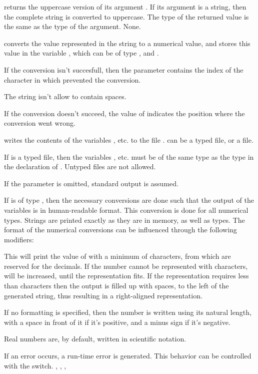 \documentclass{report}
\begin{document}
{ returns the uppercase version of its argument .
If its argument is a string, then the complete string is converted to 
uppercase. The type of the returned value is the same as the type of the
argument.}
{None.}
{}



{ converts the value represented in the string  to a numerical
value, and stores this value in the variable , which 
can be of type ,  and .

If the conversion isn't succesfull, then the parameter  contains
the index of the character in  which prevented the conversion.

The string  isn't allow to contain spaces.}
{If the conversion doesn't succeed, the value of  indicates the
position where the conversion went wrong.}
{}



{ writes the contents of the variables ,  etc. to
the file .  can be a typed file, or a  file.

If  is a typed file, then the variables ,  etc. must
be of the same type as the type in the declaration of . Untyped files
are not allowed.

If the parameter  is omitted, standard output is assumed. 

If  is of type , then the necessary conversions are done
such that the output of the variables is in human-readable format.
This conversion is done for all numerical types. Strings are printed exactly
as they are in memory, as well as  types. 
The format of the numerical conversions can be influenced through
the following modifiers:


This will print the value of  with a minimum of
 characters, from which  are reserved for the
decimals. If the number cannot be represented with  characters,
 will be increased, until the representation fits. If the
representation requires less than  characters then the output
is filled up with spaces, to the left of the generated string, thus
resulting in a right-aligned representation.

If no formatting is specified, then the number is written using its natural
length, with a space in front of it if it's positive, and a minus sign if
it's negative.

Real numbers are, by default, written in scientific notation.
}
{If an error occurs, a run-time error is generated. This behavior can be
controlled with the  switch. }
{, , ,  }
\end{document}
